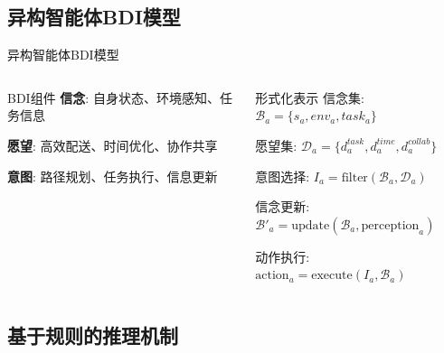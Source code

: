 \documentclass[
10pt,
aspectratio=169,
]{beamer}
\begin{document}
\subsection{异构智能体BDI模型}

\begin{frame}{异构智能体BDI模型}
    \begin{columns}
        \begin{column}{0.5\textwidth}
            \begin{exampleblock}{BDI组件}
                \textbf{信念}: 自身状态、环境感知、任务信息
                
                \textbf{愿望}: 高效配送、时间优化、协作共享
                
                \textbf{意图}: 路径规划、任务执行、信息更新
            \end{exampleblock}
        \end{column}
        \begin{column}{0.5\textwidth}
            \begin{alertblock}{形式化表示}
                信念集: $\mathcal{B}_a = \{s_a, env_a, task_a\}$
                
                愿望集: $\mathcal{D}_a = \{d^{task}_a, d^{time}_a, d^{collab}_a\}$
                
                意图选择: $I_a = \text{filter}(\mathcal{B}_a, \mathcal{D}_a)$
                
                信念更新: $\mathcal{B}'_a = \text{update}(\mathcal{B}_a, \text{perception}_a)$
                
                动作执行: $\text{action}_a = \text{execute}(I_a, \mathcal{B}_a)$
            \end{alertblock}
        \end{column}
    \end{columns}
\end{frame}

\subsection{基于规则的推理机制}
\end{document}

